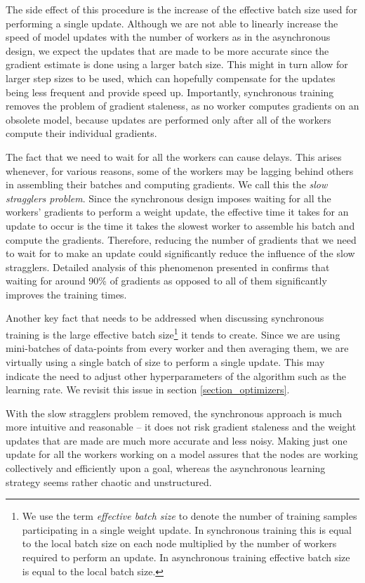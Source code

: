 \documentclass{llncs}
\begin{document}
The side effect of this procedure is the increase of the effective batch size used for performing a single update. Although we are not able to linearly increase the speed of model updates with the number of workers as in the asynchronous design, we expect the updates that are made to be more accurate since the gradient estimate is done using a larger batch size. This might in turn allow for larger step sizes to be used, which can hopefully compensate for the updates being less frequent and provide speed up. Importantly, synchronous training removes the problem of gradient staleness, as no worker computes gradients on an obsolete model, because updates are performed only after all of the workers compute their individual gradients.

The fact that we need to wait for all the workers can cause delays. This arises whenever, for various reasons, some of the workers may be lagging behind others in assembling their batches and computing gradients. We call this the \textit{slow stragglers problem}. Since the synchronous design imposes waiting for all the workers' gradients to perform a weight update, the effective time it takes for an update to occur is the time it takes the slowest worker to assemble his batch and compute the gradients. Therefore, reducing the number of gradients that we need to wait for to make an update could significantly reduce the influence of the slow stragglers. Detailed analysis of this phenomenon presented in \cite{google_brain_paper} confirms that waiting for around 90\% of gradients as opposed to all of them significantly improves the training times.

Another key fact that needs to be addressed when discussing synchronous training is the large effective batch size\footnote{We use the term \textit{effective batch size} to denote the number of training samples participating in a single weight update. In synchronous training this is equal to the local batch size on each node multiplied by the number of workers required to perform an update. In asynchronous training effective batch size is equal to the local batch size.} it tends to create. Since we are using  mini-batches of data-points from every worker and then averaging them, we are virtually using a single batch of size  to perform a single update. This may indicate the need to adjust other hyperparameters of the algorithm such as the learning rate. We revisit this issue in section \ref{section_optimizers}.

With the slow stragglers problem removed, the synchronous approach is much more intuitive and reasonable -- it does not risk gradient staleness and the weight updates that are made are much more accurate and less noisy. Making just one update for all the workers working on a model assures that the nodes are working collectively and efficiently upon a goal, whereas the asynchronous learning strategy seems rather chaotic and unstructured.
\end{document}

